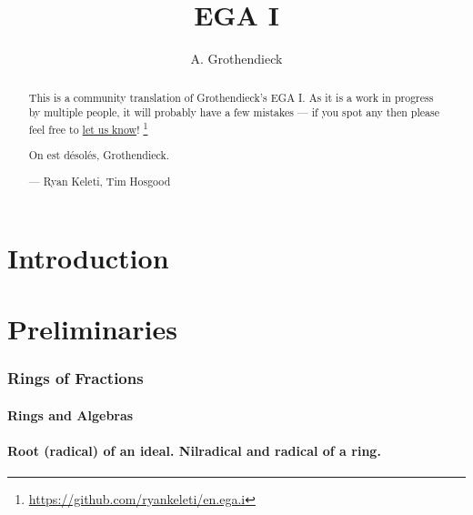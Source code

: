 \documentclass[10pt,oneside]{amsart}
\title{EGA I}
\author{A. Grothendieck}
\begin{document}
\renewcommand{\abstractname}{What this is}
\begin{abstract}
    This is a community translation of Grothendieck's EGA I.
    As it is a work in progress by multiple people, it will probably have a few mistakes --- if you spot any then please feel free to \href{https://github.com/ryankeleti/en.ega.i/issues}{let us know}!
    \thanks{\url{https://github.com/ryankeleti/en.ega.i}}
    
    On est désolés, Grothendieck.

    --- Ryan Keleti, Tim Hosgood
\end{abstract}

\maketitle

\noindent\hspace{0.15\linewidth}
\begin{minipage}{0.7\linewidth}
    \tableofcontents{}
\end{minipage}


\clearpage


\part*{Introduction}



\clearpage


\setcounter{part}{-1}

\part{Preliminaries}

    \section{Rings of Fractions}
    \setcounter{subsection}{-1}

        \subsection{Rings and Algebras}
        

        \subsection{Root (radical) of an ideal. Nilradical and radical of a ring.}
        
\end{document}
